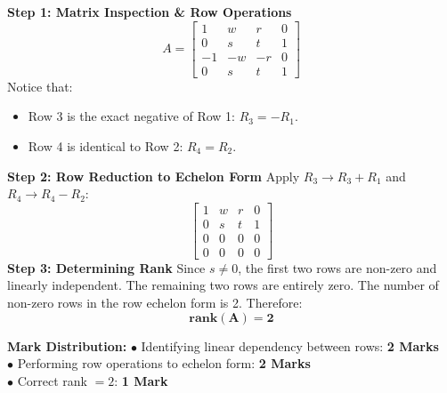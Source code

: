 \begin{solutionbox}
\textbf{Step 1: Matrix Inspection \& Row Operations}
\[
A = \begin{bmatrix}
1 & w & r & 0 \\
0 & s & t & 1 \\
-1 & -w & -r & 0 \\
0 & s & t & 1
\end{bmatrix}
\]
Notice that:
\begin{itemize}[leftmargin=6mm]
    \item Row 3 is the exact negative of Row 1: $R_3 = -R_1$.
    \item Row 4 is identical to Row 2: $R_4 = R_2$.
\end{itemize}
\textbf{Step 2: Row Reduction to Echelon Form}
Apply $R_3 \to R_3 + R_1$ and $R_4 \to R_4 - R_2$:
\[
\begin{bmatrix}
1 & w & r & 0 \\
0 & s & t & 1 \\
0 & 0 & 0 & 0 \\
0 & 0 & 0 & 0
\end{bmatrix}
\]
\textbf{Step 3: Determining Rank}
Since $s \neq 0$, the first two rows are non-zero and linearly independent. The remaining two rows are entirely zero.
The number of non-zero rows in the row echelon form is 2.
Therefore:
\[
\mathbf{\text{rank}(A) = 2}
\]

\begin{markingrubric}
\textbf{Mark Distribution:}
$\bullet$ Identifying linear dependency between rows: \textbf{2 Marks}\\
$\bullet$ Performing row operations to echelon form: \textbf{2 Marks}\\
$\bullet$ Correct rank $= 2$: \textbf{1 Mark}
\end{markingrubric}
\end{solutionbox}

